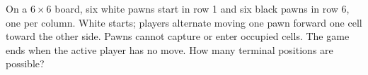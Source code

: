 On a $6\times6$ board, six white pawns start in row 1 and six black pawns in row 6, one per column. White starts; players alternate moving one pawn forward one cell toward the other side. Pawns cannot capture or enter occupied cells. The game ends when the active player has no move. How many terminal positions are possible?
